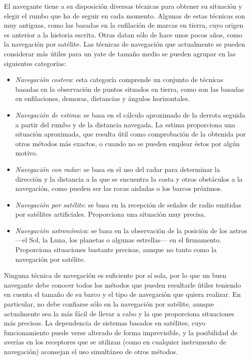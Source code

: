 El navegante tiene a su disposición diversas técnicas para obtener su situación y elegir el rumbo que ha de seguir en cada momento. Algunas de estas técnicas son muy antiguas, como las basadas en la enfilación de marcas en tierra, cuyo origen es anterior a la historia escrita. Otras datan sólo de hace unos pocos años, como la navegación por satélite. Las técnicas de navegación que actualmente se pueden considerar más útiles para un yate de tamaño medio se pueden agrupar en las siguientes categorías: 
\begin{itemize}
\item \emph{Navegación costera}: esta categoría comprende un conjunto de técnicas basadas en la observación de puntos situados en tierra, como son las basadas en enfilaciones, demoras, distancias y ángulos horizontales. 
\item \emph{Navegación de estima}: se basa en el cálculo aproximado de la derrota seguida a partir del rumbo y de la distancia navegada. La estima proporciona una situación aproximada, que resulta útil como comprobación de la obtenida por otros métodos más exactos, o cuando no se pueden emplear éstos por algún motivo. 
\item \emph{Navegación con radar}: se basa en el uso del radar para determinar la dirección y la distancia a la que se encuentra la costa y otros obstáculos a la navegación, como pueden ser las rocas aisladas o los barcos próximos. 
\item \emph{Navegación por satélite}: se basa en la recepción de señales de radio emitidas por satélites artificiales. Proporciona una situación muy precisa. 
\item \emph{Navegación astronómica}: se basa en la observación de la posición de los astros ---el Sol, la Luna, los planetas o algunas estrellas--- en el firmamento. Proporciona situaciones bastante precisas, aunque no tanto como la navegación por satélite. 
\end{itemize}

Ninguna técnica de navegación es suficiente por sí sola, por lo que un buen navegante debe conocer todos los métodos que pueden resultarle útiles teniendo en cuenta el tamaño de su barco y el tipo de navegación que quiera realizar. En particular, no debe confiarse sólo en la navegación por satélite, aunque actualmente sea la más fácil de llevar a cabo y 
la que proporciona situaciones más precisas. La dependencia de sistemas basados en satélites, cuyo funcionamiento puede verse alterado de forma imprevisible, y la posibilidad de averías en los receptores que se utilizan (como en cualquier instrumento de navegación) aconsejan el uso simultáneo de otros métodos. 

